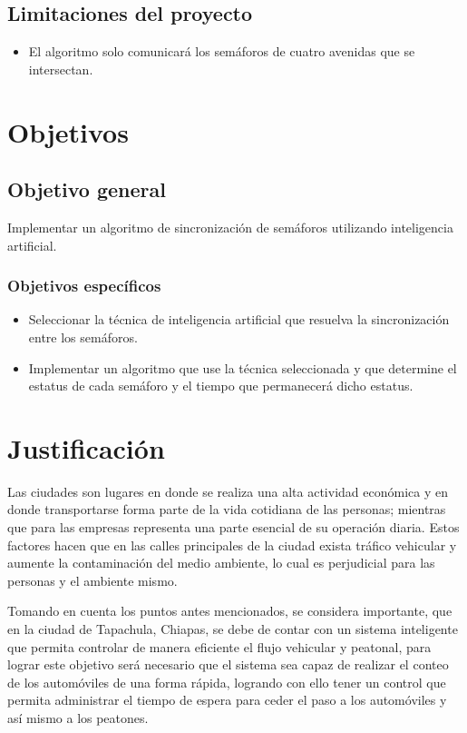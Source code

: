 \subsection*{Limitaciones del proyecto}
\begin{itemize}
\item El algoritmo solo comunicará los semáforos de cuatro avenidas que se intersectan.
\end{itemize}

\section{Objetivos}

\subsection*{Objetivo general}
Implementar un algoritmo de sincronización de semáforos utilizando inteligencia artificial.

\subsubsection*{Objetivos específicos}
\begin{itemize}
\item Seleccionar la técnica de inteligencia artificial que resuelva la sincronización entre los semáforos.
\item Implementar un algoritmo que use la técnica seleccionada y que determine el estatus de cada semáforo y el tiempo que permanecerá dicho estatus.
\end{itemize}

\section{Justificación}
Las ciudades son lugares en donde se realiza una alta actividad económica y en donde transportarse forma parte de la vida cotidiana de las personas; mientras que para las empresas representa una parte esencial de su operación diaria. Estos factores hacen que en las calles principales de la ciudad exista tráfico vehicular y aumente la contaminación del medio ambiente, lo cual es perjudicial para las personas y el ambiente mismo.

Tomando en cuenta los puntos antes mencionados, se considera importante, que en la ciudad de Tapachula, Chiapas, se debe de contar con un sistema inteligente que permita controlar de manera eficiente el flujo vehicular y peatonal, para lograr este objetivo será necesario que el sistema sea capaz de realizar el conteo de los automóviles de una forma rápida, logrando con ello tener un control que permita administrar el tiempo de espera para ceder el paso a los automóviles y así mismo a los peatones.
